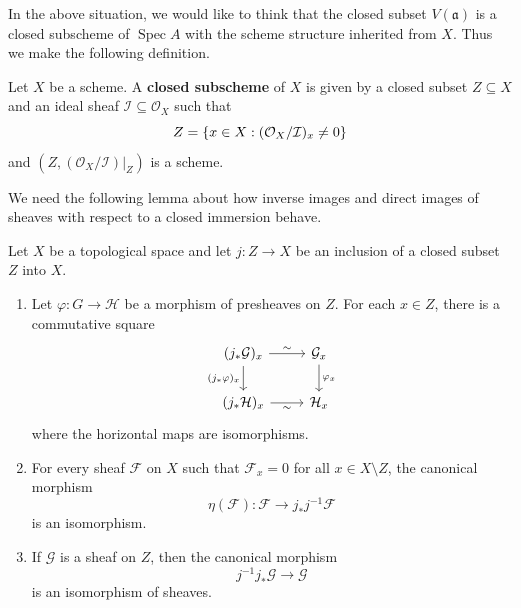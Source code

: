 \documentclass[12pt]{book}
\newcommand{\inlinedef}[1]{\textcolor{oxfordblue}{\bfseries #1}}
\theoremstyle{definition}
\DeclarePairedDelimiter{\Set}{\lbrace}{\rbrace}
\DeclareMathOperator{\Spec}{Spec}
\begin{document}
	In the above situation, we would like to think that the closed subset $V(\mathfrak{a})$ is a closed subscheme of $\Spec A$ with the scheme structure inherited from $X$. Thus we make the following definition.
	
	\begin{definition}
		Let $X$ be a scheme. A \inlinedef{closed subscheme} of $X$ is given by a closed subset $Z \subseteq X$ and an ideal sheaf $\mathcal{I} \subseteq \mathcal{O}_X$ such that
		\begin{equation*}
			Z = \Set*{ x \in X : (\mathcal{O}_X/\mathcal{I})_x \neq 0}
		\end{equation*}
		and $(Z, (\mathcal{O}_X/\mathcal{I})|_{Z})$ is a scheme.
	\end{definition}
	
	We need the following lemma about how inverse images and direct images of sheaves with respect to a closed immersion behave.
	\begin{lemma}\label{chap4:canonical-morphism-of-sheaves-on-closed-subset}
		Let $X$ be a topological space and let $j \colon Z \to X$ be an inclusion of a closed subset $Z$ into $X$.
		\begin{enumerate}
			\item Let $\varphi \colon {G} \to \mathcal{H}$ be a morphism of presheaves on $Z$. For each $x \in Z$, there is a commutative square
				\[\begin{tikzcd}
					{(j_\ast \mathcal{G})_x} & {\mathcal{G}_x} \\
					{(j_\ast \mathcal{H})_x} & {\mathcal{H}_x}
					\arrow["\sim", from=1-1, to=1-2]
					\arrow["{(j_\ast\varphi)_x}"', from=1-1, to=2-1]
					\arrow["{\varphi_x}", from=1-2, to=2-2]
					\arrow["\sim"', from=2-1, to=2-2]
				\end{tikzcd}\]
				where the horizontal maps are isomorphisms.
			
			\item For every sheaf $\mathcal{F}$ on $X$ such that $\mathcal{F}_x = 0$ for all $x \in X \setminus Z$, the canonical morphism
			\begin{equation*}
				\eta(\mathcal{F}) \colon \mathcal{F} \to j_\ast j^{-1} \mathcal{F}
			\end{equation*}
			is an isomorphism.
			\item If $\mathcal{G}$ is a sheaf on $Z$, then the canonical morphism
			\begin{equation*}
				j^{-1}j_\ast\mathcal{G} \to \mathcal{G}
			\end{equation*}
			is an isomorphism of sheaves.
		\end{enumerate}
	\end{lemma}
	
\end{document}
